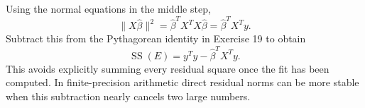 Using the normal equations in the middle step,
\[
 \|X\widehat\beta\|^2
 =\widehat\beta^TX^TX\widehat\beta
 =\widehat\beta^TX^Ty.
\]
Subtract this from the Pythagorean identity in Exercise 19 to obtain
\[
 \boxed{\operatorname{SS}(E)=y^Ty-\widehat\beta^TX^Ty}.
\]
This avoids explicitly summing every residual square once the fit has
been computed. In finite-precision arithmetic direct residual norms
can be more stable when this subtraction nearly cancels two large numbers.
